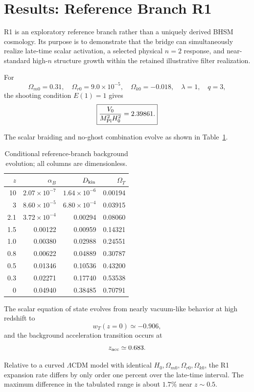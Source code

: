 \section{Results: Reference Branch R1}

R1 is an exploratory reference branch rather than a uniquely derived BHSM cosmology. Its purpose is to demonstrate that the bridge can simultaneously realize late-time scalar activation, a selected physical \(n=2\) response, and near-standard high-\(n\) structure growth within the retained illustrative filter realization.

For
\[
\Omega_{m0}=0.31,\quad
\Omega_{r0}=9.0\times10^{-5},\quad
\Omega_{k0}=-0.018,\quad
\lambda=1,\quad q=3,
\]
the shooting condition \(E(1)=1\) gives
\[
\boxed{
\frac{V_0}{M_{\rm Pl}^2H_0^2}=2.39861.
}
\]

The scalar braiding and no-ghost combination evolve as shown in Table~\ref{tab:r1background}.

\begin{table}[ht]
\centering
\begin{tabular}{rrrr}
\toprule
\(z\) & \(\alpha_B\) & \(D_{\rm kin}\) & \(\Omega_T\)\\
\midrule
10  & \(2.07\times10^{-7}\) & \(1.64\times10^{-6}\) & 0.00194\\
3   & \(8.60\times10^{-5}\) & \(6.80\times10^{-4}\) & 0.03915\\
2.1 & \(3.72\times10^{-4}\) & 0.00294 & 0.08060\\
1.5 & 0.00122 & 0.00959 & 0.14321\\
1.0 & 0.00380 & 0.02988 & 0.24551\\
0.8 & 0.00622 & 0.04889 & 0.30787\\
0.5 & 0.01346 & 0.10536 & 0.43200\\
0.3 & 0.02271 & 0.17740 & 0.53538\\
0   & 0.04940 & 0.38485 & 0.70791\\
\bottomrule
\end{tabular}
\caption{Conditional reference-branch background evolution; all columns are dimensionless.}
\label{tab:r1background}
\end{table}

The scalar equation of state evolves from nearly vacuum-like behavior at high redshift to
\[
w_T(z=0)\simeq-0.906,
\]
and the background acceleration transition occurs at
\[
z_{\rm acc}\simeq0.683.
\]

Relative to a curved \(\Lambda\)CDM model with identical \(H_0,\Omega_{m0},\Omega_{r0},\Omega_{k0}\), the R1 expansion rate differs by only order one percent over the late-time interval. The maximum difference in the tabulated range is about \(1.7\%\) near \(z\sim0.5\).

